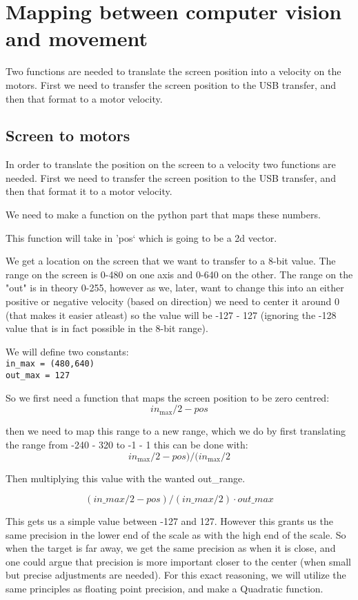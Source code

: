 \section{Mapping between computer vision and movement}
Two functions are needed to translate the screen position into a velocity on the motors.
First we need to transfer the screen position to the USB transfer, and then that format to a motor velocity.

\subsection{Screen to motors}
In order to translate the position on the screen to a velocity two functions are needed.
First we need to transfer the screen position to the USB transfer, and then that format it to a motor velocity.

We need to make a function on the python part that maps these numbers.

This function will take in 'pos` which is going to be a 2d vector.

We get a location on the screen that we want to transfer to a 8-bit value. 
The range on the screen is 0-480 on one axis and 0-640 on the other.
The range on the "out" is in theory 0-255, however as we, later, want to change this into an either positive or negative velocity (based on direction) we need to center it around 0 (that makes it easier atleast) so the value will be -127 - 127 (ignoring the -128 value that is in fact possible in the 8-bit range).


We will define two constants:\\
\texttt{in\_max = (480,640)}\\
\texttt{out\_max = 127}

So we first need a function that maps the screen position to be zero centred: 
$$
in_\text{max}/2 - pos
$$

then we need to map this range to a new range, which we do by first translating the range from -240 - 320 to -1 - 1
this can be done with:
$$
in_\text{max}/2 - pos)/(in_\text{max}/2
$$


Then multiplying this value with the wanted out\_range.

$$
(in\_max/2 - pos)/(in\_max/2) \cdot out\_max
$$

This gets us a simple value between -127 and 127. 
However this grants us the same precision in the lower end of the scale as with the high end of the scale.
So when the target is far away, we get the same precision as when it is close, and one could argue that precision is more important closer to the center (when small but precise adjustments are needed).
For this exact reasoning, we will utilize the same principles as floating point precision, and make a Quadratic function. 

